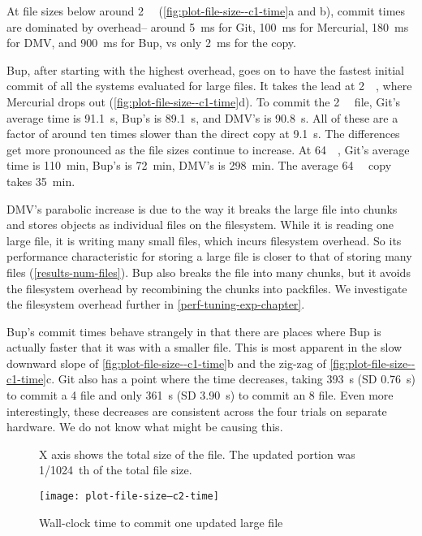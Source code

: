 At file sizes below around \SI{2}{\mebi\byte}
(\autoref{fig:plot-file-size--c1-time}a and b), \gls{commit} times are dominated
by overhead-- around \SI{5}{\ms} for Git, \SI{100}{\ms} for Mercurial,
\SI{180}{\ms} for \gls{DMV}, and \SI{900}{\ms} for Bup, vs only \SI{2}{\ms} for
the copy.

Bup, after starting with the highest overhead, goes on to have the fastest
initial \gls{commit} of all the systems evaluated for large files. It takes the
lead at \SI{2}{\gibi\byte}, where Mercurial drops out
(\autoref{fig:plot-file-size--c1-time}d). To \gls{commit} the \SI{2}{\gibi\byte}
file, Git's average time is \SI{91.1}{\s}, Bup's is \SI{89.1}{\s}, and
\gls{DMV}'s is \SI{90.8}{\s}. All of these are a factor of around ten times
slower than the direct copy at \SI{9.1}{\s}. The differences get more pronounced
as the file sizes continue to increase. At \SI{64}{\gibi\byte}, Git's average
time is \SI{110}{\minute}, Bup's is \SI{72}{\minute}, \gls{DMV}'s is
\SI{298}{\minute}. The average \SI{64}{\gibi\byte} copy takes \SI{35}{\minute}.

DMV's parabolic increase is due to the way it breaks the large file into chunks
and stores objects as individual files on the filesystem. While it is reading
one large file, it is writing many small files, which incurs filesystem
overhead. So its performance characteristic for storing a large file is closer
to that of storing many files (\autoref{results-num-files}). Bup also breaks the
file into many chunks, but it avoids the filesystem overhead by recombining the
chunks into \glspl{packfile}. We investigate the filesystem overhead further in
\autoref{perf-tuning-exp-chapter}.

Bup's commit times behave strangely in that there are places where Bup is
actually faster that it was with a smaller file. This is most apparent in the
slow downward slope of \autoref{fig:plot-file-size--c1-time}b and the zig-zag of
\autoref{fig:plot-file-size--c1-time}c. Git also has a point where the time
decreases, taking \SI{393}{\s} (SD \SI{.76}{\s}) to commit a \SI{4}{\gib} file
and only \SI{361}{\s} (SD \SI{3.90}{\s}) to commit an \SI{8}{\gib} file. Even
more interestingly, these decreases are consistent across the four trials on
separate hardware. We do not know what might be causing this.

%


\begin{figure}[p]
    \begin{leftfullpage}
        \caption{Wall-clock time to commit one updated large file}
        \label{fig:plot-file-size--c2-time}
        \centering

        X axis shows the total size of the file. The updated portion was
        \SI{1/1024}{th} of the total file size.
        \explainlogsubfig

        \texttt{[image: plot-file-size--c2-time]}
    \end{leftfullpage}
\end{figure}

